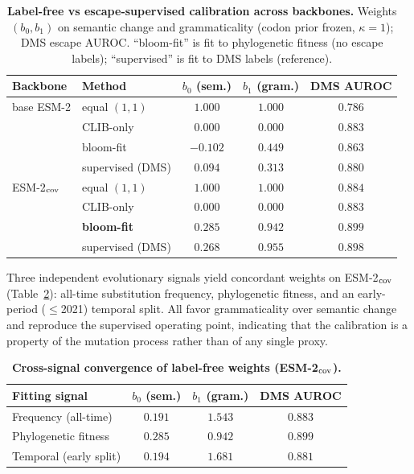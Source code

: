 \documentclass{article}
\numberwithin{theorem}{section}
\begin{document}
\begin{table}[htbp]
    \centering
    \caption{\textbf{Label-free vs escape-supervised calibration across backbones.}
    Weights $(b_0,b_1)$ on semantic change and grammaticality (codon prior frozen,
    $\kappa=1$); DMS escape AUROC. ``bloom-fit'' is fit to phylogenetic fitness
    (no escape labels); ``supervised'' is fit to DMS labels (reference).}
    \begin{tabular}{l|l|cc|c}
        \toprule
        Backbone & Method & $b_0$ (sem.) & $b_1$ (gram.) & DMS AUROC \\
        \midrule
        base ESM-2 & equal $(1,1)$      & $1.000$  & $1.000$  & $0.786$ \\
                   & CLIB-only          & $0.000$  & $0.000$  & $0.883$ \\
                   & bloom-fit          & $-0.102$ & $0.449$  & $0.863$ \\
                   & supervised (DMS)   & $0.094$  & $0.313$  & $0.880$ \\
        \midrule
        ESM-2$_{\rm cov}$ & equal $(1,1)$    & $1.000$ & $1.000$ & $0.884$ \\
                          & CLIB-only        & $0.000$ & $0.000$ & $0.883$ \\
                          & \textbf{bloom-fit} & $\mathbf{0.285}$ & $\mathbf{0.942}$ & $\mathbf{0.899}$ \\
                          & supervised (DMS) & $0.268$ & $0.955$ & $0.898$ \\
        \bottomrule
    \end{tabular}
    \label{tab:supp-labelfree}
\end{table}

Three independent evolutionary signals yield concordant weights on
ESM-2$_{\rm cov}$ (Table~\ref{tab:supp-crosssignal}): all-time substitution
frequency, phylogenetic fitness, and an early-period ($\le$2021) temporal split.
All favor grammaticality over semantic change and reproduce the supervised
operating point, indicating that the calibration is a property of the mutation
process rather than of any single proxy.

\begin{table}[htbp]
    \centering
    \caption{\textbf{Cross-signal convergence of label-free weights (ESM-2$_{\rm cov}$).}}
    \begin{tabular}{l|cc|c}
        \toprule
        Fitting signal & $b_0$ (sem.) & $b_1$ (gram.) & DMS AUROC \\
        \midrule
        Frequency (all-time)    & $0.191$ & $1.543$ & $0.883$ \\
        Phylogenetic fitness    & $0.285$ & $0.942$ & $0.899$ \\
        Temporal (early split)  & $0.194$ & $1.681$ & $0.881$ \\
        \bottomrule
    \end{tabular}
    \label{tab:supp-crosssignal}
\end{table}
\end{document}
